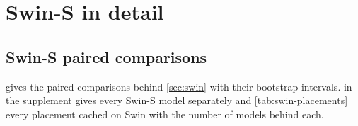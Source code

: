
\FloatBarrier


\FloatBarrier
\clearpage

\section{Swin-S in detail}
\label{app:swin-group}

\subsection{Swin-S paired comparisons}
\label{app:swin}

 gives the paired comparisons behind \cref{sec:swin} with their bootstrap intervals.  in the supplement gives every Swin-S model separately and \cref{tab:swin-placements} every placement cached on Swin with the number of models behind each.



\FloatBarrier
\clearpage

